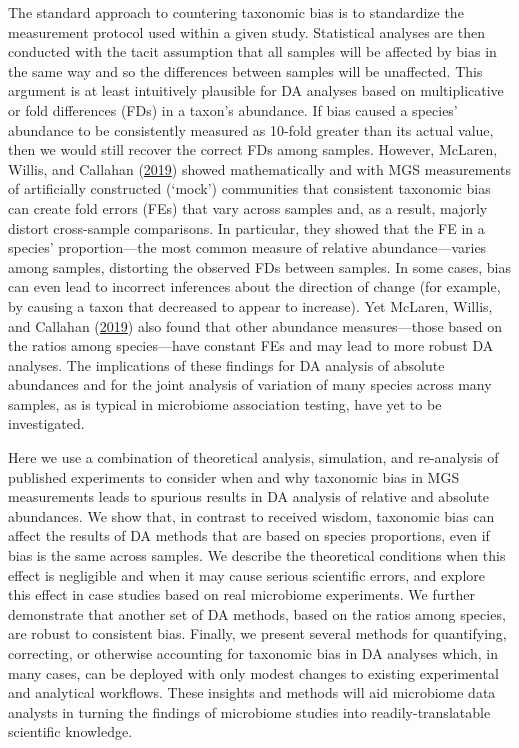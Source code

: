 \documentclass[
]{article}
\begin{document}
The standard approach to countering taxonomic bias is to standardize the measurement protocol used within a given study.
Statistical analyses are then conducted with the tacit assumption that all samples will be affected by bias in the same way and so the differences between samples will be unaffected.
This argument is at least intuitively plausible for DA analyses based on multiplicative or fold differences (FDs) in a taxon's abundance.
If bias caused a species' abundance to be consistently measured as 10-fold greater than its actual value, then we would still recover the correct FDs among samples.
However, McLaren, Willis, and Callahan (\protect\hyperlink{ref-mclaren2019cons}{2019}) showed mathematically and with MGS measurements of artificially constructed (`mock') communities that consistent taxonomic bias can create fold errors (FEs) that vary across samples and, as a result, majorly distort cross-sample comparisons.
In particular, they showed that the FE in a species' proportion---the most common measure of relative abundance---varies among samples, distorting the observed FDs between samples.
In some cases, bias can even lead to incorrect inferences about the direction of change (for example, by causing a taxon that decreased to appear to increase).
Yet McLaren, Willis, and Callahan (\protect\hyperlink{ref-mclaren2019cons}{2019}) also found that other abundance measures---those based on the ratios among species---have constant FEs and may lead to more robust DA analyses.
The implications of these findings for DA analysis of absolute abundances and for the joint analysis of variation of many species across many samples, as is typical in microbiome association testing, have yet to be investigated.

Here we use a combination of theoretical analysis, simulation, and re-analysis of published experiments to consider when and why taxonomic bias in MGS measurements leads to spurious results in DA analysis of relative and absolute abundances.
We show that, in contrast to received wisdom, taxonomic bias can affect the results of DA methods that are based on species proportions, even if bias is the same across samples.
We describe the theoretical conditions when this effect is negligible and when it may cause serious scientific errors, and explore this effect in case studies based on real microbiome experiments.
We further demonstrate that another set of DA methods, based on the ratios among species, are robust to consistent bias.
Finally, we present several methods for quantifying, correcting, or otherwise accounting for taxonomic bias in DA analyses which, in many cases, can be deployed with only modest changes to existing experimental and analytical workflows.
These insights and methods will aid microbiome data analysts in turning the findings of microbiome studies into readily-translatable scientific knowledge.
\end{document}
